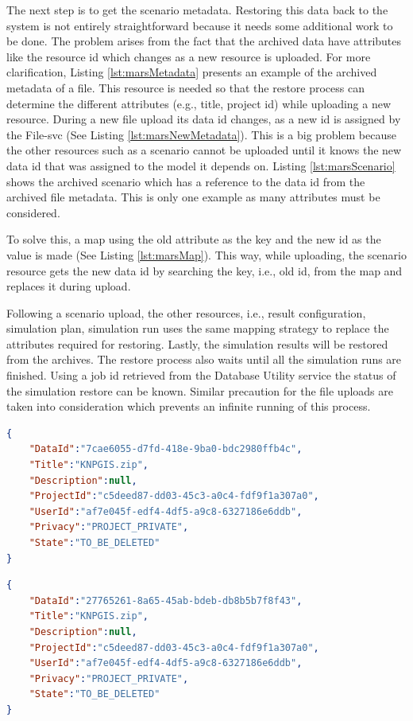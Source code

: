 The next step is to get the scenario metadata. Restoring this data back to the system is not entirely straightforward because it needs some additional 
work to be done. 
The problem arises from the fact that the archived data have attributes like the resource id which changes as a new resource is uploaded. For more clarification, 
Listing \ref{lst:marsMetadata} presents an example of the archived metadata of a file. This resource is needed so that the restore process can determine the different 
attributes (e.g., title, project id) while uploading a new resource. During a new file upload 
its data id changes, as a new id is assigned by the File-svc (See Listing \ref{lst:marsNewMetadata}). 
This is a big problem because the other resources such as a scenario cannot be uploaded until it knows the new data id that was assigned to the model it 
depends on. Listing \ref{lst:marsScenario} shows the archived scenario which has a reference to the data id from the archived file metadata. 
This is only one example as many attributes must be considered. 

To solve this, a map using the old attribute as the key and the 
new id as the value is made (See Listing \ref{lst:marsMap}).
This way, while uploading, the scenario resource gets the new data id by searching the key, i.e., old id, from the map and replaces it during upload. 

Following a scenario upload, the other resources, i.e., result configuration, simulation plan, simulation run uses the same mapping strategy to replace 
the attributes required for restoring. 
Lastly, the simulation results will be restored from the archives. The restore process also waits until all the simulation runs are finished. Using a job id retrieved from the Database 
Utility service the status of the simulation restore can be known. Similar precaution for the file uploads are taken into consideration which prevents an infinite running
of this process.


\newpage
\begin{lstlisting}[caption={Snippet of archived MARS metadata resource}, language=json,firstnumber=1, captionpos=b, label={lst:marsMetadata}]
{
    "DataId":"7cae6055-d7fd-418e-9ba0-bdc2980ffb4c",
    "Title":"KNPGIS.zip",
    "Description":null,
    "ProjectId":"c5deed87-dd03-45c3-a0c4-fdf9f1a307a0",
    "UserId":"af7e045f-edf4-4df5-a9c8-6327186e6ddb",
    "Privacy":"PROJECT_PRIVATE",
    "State":"TO_BE_DELETED"
}
\end{lstlisting}

\begin{lstlisting}[caption={Snippet of the uploaded MARS metadata resource}, language=json,firstnumber=1, captionpos=b, label={lst:marsNewMetadata}]
{
    "DataId":"27765261-8a65-45ab-bdeb-db8b5b7f8f43",
    "Title":"KNPGIS.zip",
    "Description":null,
    "ProjectId":"c5deed87-dd03-45c3-a0c4-fdf9f1a307a0",
    "UserId":"af7e045f-edf4-4df5-a9c8-6327186e6ddb",
    "Privacy":"PROJECT_PRIVATE",
    "State":"TO_BE_DELETED"
}
\end{lstlisting}


